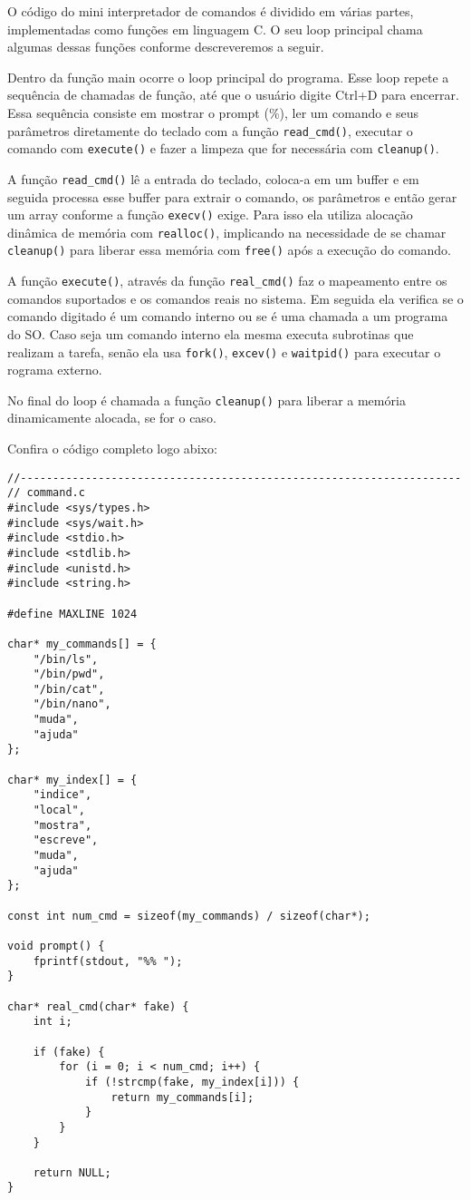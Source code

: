O código do mini interpretador de comandos é dividido em várias partes, implementadas como funções em linguagem C. O seu loop principal chama algumas dessas funções conforme descreveremos a seguir.

Dentro da função main ocorre o loop principal do programa. Esse loop repete a sequência de chamadas de função, até que o usuário digite Ctrl+D para encerrar. Essa sequência consiste em mostrar o prompt (\%), ler um comando e seus parâmetros diretamente do teclado com a função \texttt{read\_{}cmd()}, executar o comando com \texttt{execute()} e fazer a limpeza que for necessária com \texttt{cleanup()}.

A função \texttt{read\_{}cmd()} lê a entrada do teclado, coloca-a em um buffer e em seguida processa esse buffer para extrair o comando, os parâmetros e então gerar um array conforme a função \texttt{execv()} exige. Para isso ela utiliza alocação dinâmica de memória com \texttt{realloc()}, implicando na necessidade de se chamar \texttt{cleanup()} para liberar essa memória com \texttt{free()} após a execução do comando.

A função \texttt{execute()}, através da função \texttt{real\_{}cmd()} faz o mapeamento entre os comandos suportados e os comandos reais no sistema. Em seguida ela verifica se o comando digitado é um comando interno ou se é uma chamada a um programa do SO. Caso seja um comando interno ela mesma executa subrotinas que realizam a tarefa, senão ela usa \texttt{fork()}, \texttt{excev()} e \texttt{waitpid()} para executar o rograma externo.

No final do loop é chamada a função \texttt{cleanup()} para liberar a memória dinamicamente alocada, se for o caso.

Confira o código completo logo abixo: 

\newpage
\begin{espacosimples}
\begin{verbatim}
//--------------------------------------------------------------------
// command.c
#include <sys/types.h>
#include <sys/wait.h>
#include <stdio.h>
#include <stdlib.h>
#include <unistd.h>
#include <string.h>

#define MAXLINE 1024

char* my_commands[] = {
    "/bin/ls",
    "/bin/pwd",
    "/bin/cat",
    "/bin/nano",
    "muda",
    "ajuda"
};

char* my_index[] = {
    "indice",
    "local",
    "mostra",
    "escreve",
    "muda",
    "ajuda"
};

const int num_cmd = sizeof(my_commands) / sizeof(char*);

void prompt() {
    fprintf(stdout, "%% ");
}

char* real_cmd(char* fake) {
    int i;
    
    if (fake) {
        for (i = 0; i < num_cmd; i++) {
            if (!strcmp(fake, my_index[i])) {
                return my_commands[i];
            }
        }
    }
    
    return NULL;
}
\end{verbatim}
\end{espacosimples}

